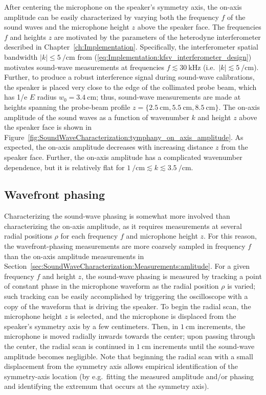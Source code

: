 \label{sec:SoundWaveCharacterization:Measurements:amlitude}
After centering the microphone on the speaker's symmetry axis,
the on-axis amplitude can be easily characterized by
varying both the frequency $f$ of the sound waves and
the microphone height $z$ above the speaker face.
The frequencies $f$ and heights $z$
are motivated by the parameters of the heterodyne interferometer
described in Chapter~\ref{ch:Implementation}.
Specifically, the interferometer spatial bandwidth
$|k| \leq \SI{5}{\per\centi\meter}$
from (\ref{eq:Implementation:kfsv_interferometer_design}) motivates
sound-wave measurements at frequencies
$f \lesssim \SI{30}{\kilo\hertz}$
(i.e.\ $|k| \lesssim \SI{5}{\per\centi\meter}$).
Further, to produce a robust interference signal
during sound-wave calibrations,
the speaker is placed very close
to the edge of the collimated probe beam,
which has 1/e $E$ radius $w_0 = \SI{3.4}{\centi\meter}$;
thus, sound-wave measurements are made at heights
spanning the probe-beam profile
$z
=
\{\SI{2.5}{\centi\meter}, \SI{5.5}{\centi\meter}, \SI{8.5}{\centi\meter}\}$.
The on-axis amplitude of the sound waves as a function of
wavenumber $k$ and height $z$ above the speaker face is shown in
Figure~\ref{fig:SoundWaveCharacterization:tymphany_on_axis_amplitude}.
As expected, the on-axis amplitude decreases with
increasing distance $z$ from the speaker face.
Further, the on-axis amplitude has a complicated wavenumber dependence, but
it is relatively flat for
$\SI{1}{\per\centi\meter} \lesssim k \lesssim \SI{3.5}{\per\centi\meter}$.


\subsection{Wavefront phasing}
\label{sec:SoundWaveCharacterization:Measurements:phasing}
Characterizing the sound-wave phasing is somewhat more involved
than characterizing the on-axis amplitude,
as it requires measurements at several radial positions $\rho$
for each frequency $f$ and microphone height $z$.
For this reason, the wavefront-phasing measurements
are more coarsely sampled in frequency $f$
than the on-axis amplitude measurements in
Section~\ref{sec:SoundWaveCharacterization:Measurements:amlitude}.
For a given frequency $f$ and height $z$,
the sound-wave phasing is measured by
tracking a point of constant phase in the microphone waveform
as the radial position $\rho$ is varied;
such tracking can be easily accomplished
by triggering the oscilloscope
with a copy of the waveform that is driving the speaker.
To begin the radial scan,
the microphone height $z$ is selected, and
the microphone is displaced from the speaker's symmetry axis
by a few centimeters.
Then, in $\SI{1}{\centi\meter}$ increments,
the microphone is moved radially inwards towards the center;
upon passing through the center,
the radial scan is continued in $\SI{1}{\centi\meter}$ increments
until the sound-wave amplitude becomes negligible.
Note that beginning the radial scan
with a small displacement from the symmetry axis
allows empirical identification of the symmetry-axis location
(by e.g.\ fitting the measured amplitude and/or phasing
and identifying the extremum that occurs at the symmetry axis).

